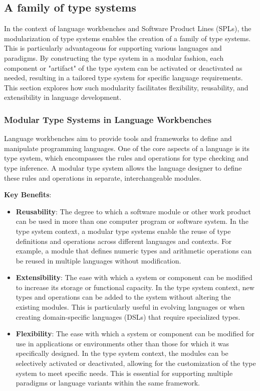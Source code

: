 \subsection{A family of type systems}\label{subsec:concept:AFamilyOfTypeSystems}
In the context of language workbenches and Software Product Lines (SPLs), the modularization of type systems enables the creation of a family of type systems. This is particularly advantageous for supporting various languages and paradigms. By constructing the type system in a modular fashion, each component or "artifact" of the type system can be activated or deactivated as needed, resulting in a tailored type system for specific language requirements. This section explores how such modularity facilitates flexibility, reusability, and extensibility in language development.

\subsubsection{Modular Type Systems in Language Workbenches}

Language workbenches aim to provide tools and frameworks to define and manipulate programming languages. One of the core aspects of a language is its type system, which encompasses the rules and operations for type checking and type inference. A modular type system allows the language designer to define these rules and operations in separate, interchangeable modules.

\noindent \textbf{Key Benefits}:
\begin{itemize}
    \item \textbf{Reusability}: The degree to which a software module or other work product can be used in more than one computer program or software system. In the type system context, a modular type systems enable the reuse of type definitions and operations across different languages and contexts. For example, a module that defines numeric types and arithmetic operations can be reused in multiple languages without modification.
    \item \textbf{Extensibility}: The ease with which a system or component can be modified to  increase its storage or functional capacity. In the type system context, new types and operations can be added to the system without altering the existing modules. This is particularly useful in evolving languages or when creating domain-specific languages (DSLs) that require specialized types.
    \item\textbf{ Flexibility}: The ease with which a system or component can be modified for use in applications or environments other than those for which it was specifically designed. In the type system context, the modules can be selectively activated or deactivated, allowing for the customization of the type system to meet specific needs. This is essential for supporting multiple paradigms or language variants within the same framework.
\end{itemize}


